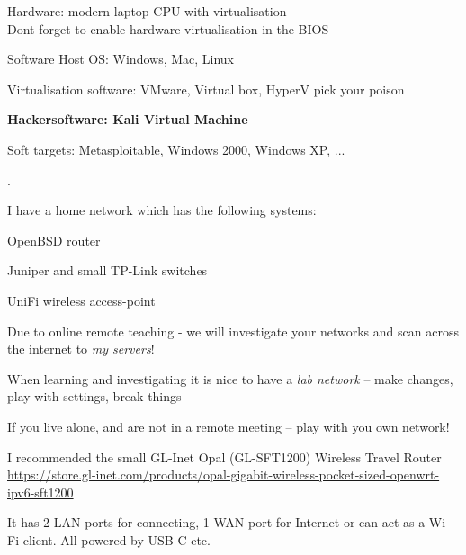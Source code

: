 \documentclass[Screen16to9,17pt]{foils}
\begin{document}


\begin{list2}
\item Hardware: modern laptop CPU with virtualisation\\
Dont forget to enable hardware virtualisation in the BIOS
\item Software Host OS: Windows, Mac, Linux
\item Virtualisation software: VMware, Virtual box, HyperV pick your poison
\item {\bf Hackersoftware: Kali Virtual Machine }
\item Soft targets: Metasploitable, Windows 2000, Windows XP, ...
\end{list2}

.

\begin{list1}
\item I have a home network which has the following systems:
\begin{list2}
\item OpenBSD router
\item Juniper and small TP-Link switches
\item UniFi wireless access-point
\end{list2}
\end{list1}

Due to online remote teaching - we will investigate your networks and scan across the internet to \emph{my servers}!



\begin{list2}
\item When learning and investigating it is nice to have a \emph{lab network} -- make changes, play with settings, break things
\item If you live alone, and are not in a remote meeting -- play with you own network!
\item I recommended the small GL-Inet Opal (GL-SFT1200) Wireless Travel Router\\
\url{https://store.gl-inet.com/products/opal-gigabit-wireless-pocket-sized-openwrt-ipv6-sft1200}
\item It has 2 LAN ports for connecting, 1 WAN port for Internet or can act as a Wi-Fi client. All powered by USB-C etc.
\end{list2}
\end{document}
